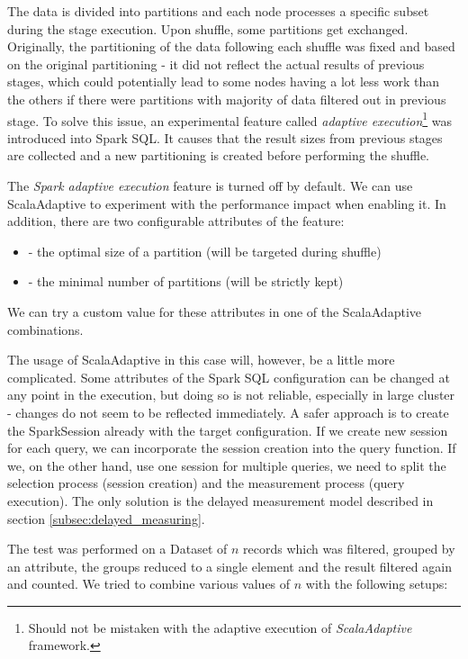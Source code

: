 The data is divided into partitions and each node processes a specific subset during the stage execution. Upon shuffle, some partitions get exchanged. Originally, the partitioning of the data following each shuffle was fixed and based on the original partitioning - it did not reflect the actual results of previous stages, which could potentially lead  to some nodes having a lot less work than the others if there were partitions with majority of data filtered out in previous stage. To solve this issue, an experimental feature called \textit{adaptive execution}\footnote{Should not be mistaken with the adaptive execution of \textit{ScalaAdaptive} framework.} was introduced into Spark SQL. It causes that the result sizes from previous stages are collected and a new partitioning is created before performing the shuffle.

The \textit{Spark adaptive execution} feature is turned off by default. We can use ScalaAdaptive to experiment with the performance impact when enabling it. In addition, there are two configurable attributes of the feature:
\begin{itemize}
	\item {} - the optimal size of a partition (will be targeted during shuffle)
	\item {} - the minimal number of partitions (will be strictly kept)
\end{itemize}
We can try a custom value for these attributes in one of the ScalaAdaptive combinations.

The usage of ScalaAdaptive in this case will, however, be a little more complicated. Some attributes of the Spark SQL configuration can be changed at any point in the execution, but doing so is not reliable, especially in large cluster - changes do not seem to be reflected immediately. A safer approach is to create the SparkSession already with the target configuration. If we create new session for each query, we can incorporate the session creation into the query function. If we, on the other hand, use one session for multiple queries, we need to split the selection process (session creation) and the measurement process (query execution). The only solution is the delayed measurement model described in section \ref{subsec:delayed_measuring}.

The test was performed on a Dataset of $n$ records which was filtered, grouped by an attribute, the groups reduced to a single element and the result filtered again and counted. We tried to combine various values of $n$ with the following setups:


